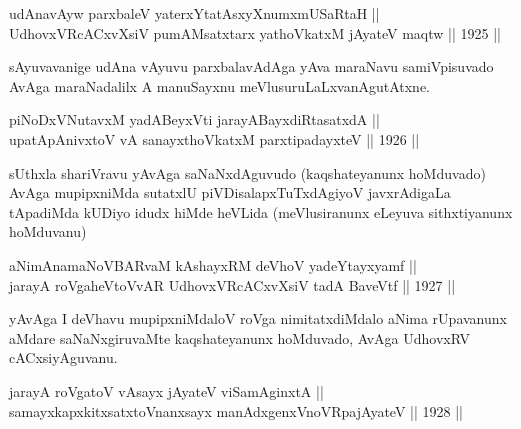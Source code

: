 
\begin{shl}
udAnavAyw parxbaleV yaterxYtatAsxyXnumxmUSaRtaH ||  \\
UdhovxVRcACxvXsiV pumAMsatxtarx yathoVkatxM jAyateV maqtw \hfill || 1925 ||
  
\end{shl}

\begin{artha}
sAyuvavanige udAna vAyuvu parxbalavAdAga yAva maraNavu samiVpisuvado
AvAga maraNadalilx A manuSayxnu meVlusuruLaLxvanAgutAtxne.
\end{artha}


\begin{shl}
piNoDxV\s NutavxM yadA\s BeyxVti jarayA\s BayxdiRtasatxdA || \\
upatApAnivxtoV vA sanayxthoVkatxM parxtipadayxteV \hfill || 1926 ||
  
\end{shl}

\begin{artha}
sUthxla shariVravu yAvAga saNaNxdAguvudo (kaqshateyanunx hoMduvado)
AvAga mupipxniMda sutatxlU piVDisalapxTuTxdAgiyoV javxrAdigaLa
tApadiMda kUDiyo idudx hiMde heVLida (meVlusiranunx eLeyuva
sithxtiyanunx hoMduvanu)
\end{artha}

\begin{shl}
aNimAnamaNoVBARvaM kAshayxRM deVhoV yadeYtayxyamf || \\
jarayA roVgaheVtoVvAR UdhovxVRcACxvXsiV tadA BaveVtf \hfill || 1927 ||
  
\end{shl}

\begin{artha}
yAvAga I deVhavu mupipxniMdaloV roVga nimitatxdiMdalo aNima rUpavanunx
aMdare saNaNxgiruvaMte kaqshateyanunx hoMduvado, AvAga UdhovxRV
cACxsiyAguvanu.
\end{artha}


\begin{shl}
jarayA roVgatoV vA\s sayx jAyateV viSamAginxtA || \\
samayxkapxkitxsatxtoV\s nanxsayx manAdxgenxVnoVRpajAyateV \hfill || 1928 ||
 
\end{shl}


